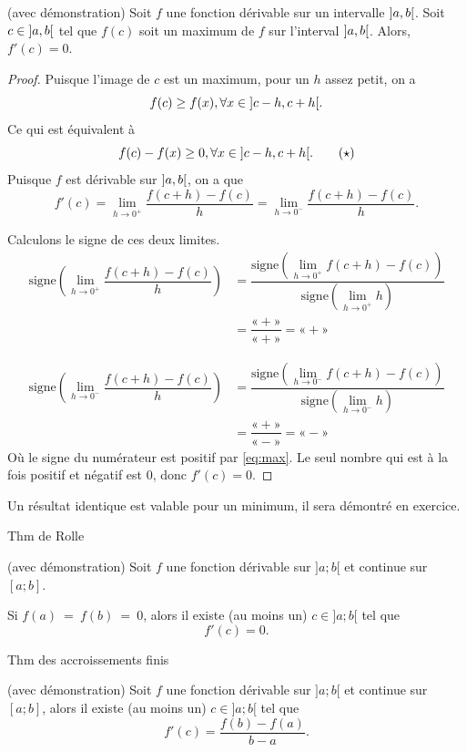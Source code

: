 \documentclass[a4paper,12pt]{article}
\begin{document}
\begin{prop}[label=prop:max]
	(avec démonstration)
	\tcblower
	Soit $f$ une fonction dérivable sur un intervalle $\ointerval{a}{b}$. Soit $c\in \ointerval{a}{b}$ tel que $f(c)$ soit un maximum de $f$ sur l'interval $\ointerval{a}{b}$. Alors, $f'(c)=0$.

	\begin{proof}
	Puisque l'image de $c$ est un maximum, pour un $h$ assez petit, on a
	\[f(c)\geq f(x),  \forall x\in \ointerval{c-h}{c+h}.\]	
	Ce qui est équivalent à 
	\begin{equation}
	f(c)-f(x)\geq 0,  \forall x\in \ointerval{c-h}{c+h}.
	\tag{$\star$}
	\label{eq:max}
\end{equation}
	Puisque $f$ est dérivable sur $\ointerval{a}{b}$, on a que  
	\[f'(c)=\lim_{h\to 0^+}\dfrac{f(c+h)-f(c)}{h}=\lim_{h\to 0^-}\dfrac{f(c+h)-f(c)}{h}.\]

	Calculons le signe de ces deux limites.
	\begin{align*}
		\text{signe}\left(\lim_{h\to 0^+}\dfrac{f(c+h)-f(c)}{h}\right)&=\dfrac{\text{signe}\left(\displaystyle{\lim_{h\to 0^+}}f(c+h)-f(c)\right)}{\text{signe}\left(\displaystyle{\lim_{h\to 0^+}}h\right)}\\
		&=\dfrac{«+»}{«+»}=«+»
\end{align*}

	\begin{align*}
		\text{signe}\left(\lim_{h\to 0^-}\dfrac{f(c+h)-f(c)}{h}\right)&=\dfrac{\text{signe}\left(\displaystyle{\lim_{h\to 0^-}}f(c+h)-f(c)\right)}{\text{signe}\left(\displaystyle{\lim_{h\to 0^-}}h\right)}\\
		&=\dfrac{«+»}{«-»}=«-»
\end{align*}
Où le signe du numérateur est positif par \eqref{eq:max}. 
	Le seul nombre qui est à la fois positif et négatif est $0$, donc $f'(c)=0$.
	\end{proof}
\end{prop}
\begin{remarque}
	\tcblower
Un résultat identique est valable pour un minimum, il sera démontré en exercice.
\end{remarque}

\begin{thm}
	Thm de Rolle

	(avec démonstration)
	\tcblower
	Soit $f$ une fonction dérivable sur $] a;b[$ et continue sur $[a;b]$. 

	Si $f(a)~=~f(b)~=~0$, alors il existe (au moins un) $c\in] a;b[$ tel que 
	\[f'(c)=0.\]
\end{thm}
\begin{thm}
	Thm des accroissements finis

	(avec démonstration)
	\tcblower
	Soit $f$ une fonction dérivable sur $] a;b[$ et continue sur $[a;b]$, alors il existe (au moins un) $c\in ]a;b[$ tel que 
	\[f'(c)=\dfrac{f(b)-f(a)}{b-a}.\]
\end{thm}
\end{document}
